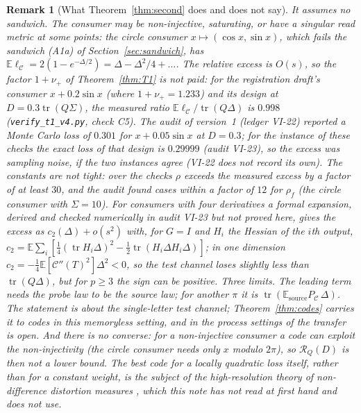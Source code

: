 \documentclass[11pt,onecolumn]{IEEEtran}
\newtheorem{remark}[theorem]{Remark}
\newcommand{\E}{\mathbb{E}}
\newcommand{\tr}{\operatorname{tr}}
\newcommand{\PC}{P_{\mathcal C}}
\newcommand{\cR}{\mathcal R}
\newcommand{\nup}{\nu_{+}}
\begin{document}
\begin{remark}[What Theorem~\ref{thm:second} does and does not say]\label{rem:second}
It assumes no sandwich. The consumer may be non-injective, saturating, or have a
singular read metric at some points: the circle consumer $x\mapsto(\cos x,\sin x)$,
which fails the sandwich (A1a) of Section~\ref{sec:sandwich}, has $\E\ell_{\mathcal C}=2(1-e^{-\Delta/2})=\Delta-\Delta^2/4+\dots$.
The relative excess is $O(s)$, so the factor $1+\nup$ of Theorem~\ref{thm:T1} is not
paid: for the registration draft's consumer $x+0.2\sin x$ (where $1+\nup=1.233$) and its
design at $D=0.3\tr(Q\Sigma)$, the measured ratio $\E\ell_{\mathcal C}/\tr(Q\Delta)$ is $0.998$
(\texttt{verify\_t1\_v4.py}, check C5). The audit of version~1 (ledger VI-22)
reported a Monte Carlo loss of $0.301$ for $x+0.05\sin x$ at $D=0.3$; for the instance
of these checks the exact loss of that design is $0.29999$ (audit VI-23), so the
excess was sampling noise, if the two instances agree (VI-22 does not record its own).
The constants are not tight: over the checks $\rho$ exceeds the measured excess by a
factor of at least $30$, and the audit found cases within a factor of $12$ for
$\rho_f$ (the circle consumer with $\Sigma=10$). For consumers with four derivatives a
formal expansion, derived and checked numerically in audit VI-23 but not proved here,
gives the excess as $c_2(\Delta)+o(s^2)$ with, for $G=I$ and $H_i$ the Hessian of the
$i$th output, $c_2=\E\sum_i[\tfrac14(\tr H_i\Delta)^2-\tfrac12\tr(H_i\Delta H_i\Delta)]$;
in one dimension $c_2=-\tfrac14\E[\mathcal C''(T)^2]\Delta^2<0$, so the test channel
loses slightly less than $\tr(Q\Delta)$, but for $p\ge3$ the sign can be positive. Three
limits. The leading term needs the probe law to be the source law; for another $\pi$ it
is $\tr(\E_{\mathrm{source}}\PC\,\Delta)$. The statement is about the single-letter test
channel; Theorem~\ref{thm:codes} carries it to codes in this memoryless setting, and in
the process settings of \cite{part2,part3,part4} the transfer is open. And there is no
converse: for a non-injective consumer a code can exploit the non-injectivity (the
circle consumer needs only $x$ modulo $2\pi$), so $\cR_Q(D)$ is then not a lower bound.
The best code for a locally quadratic loss itself, rather than for a constant weight,
is the subject of the high-resolution theory of non-difference distortion measures
\cite{linderzamir}, which this note has not read at first hand and does not use.
\end{remark}
\end{document}
